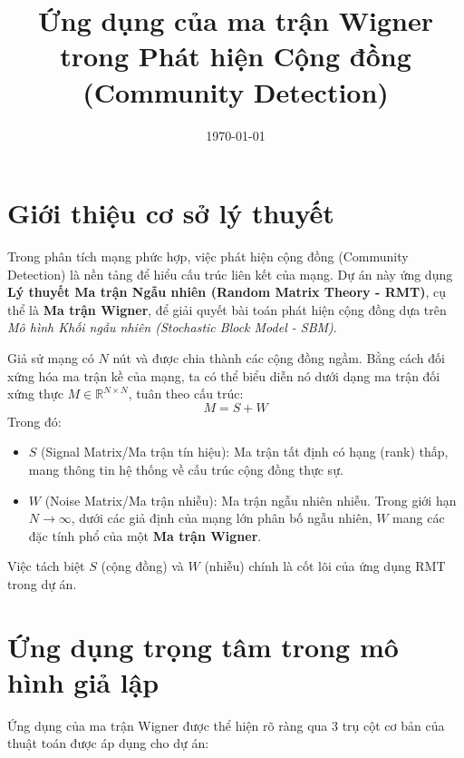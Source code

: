 \documentclass[12pt,a4paper]{article}
\title{\textbf{Ứng dụng của ma trận Wigner trong Phát hiện Cộng đồng (Community Detection)}}
\author{}
\date{\today}
\begin{document}
\maketitle

\section{Giới thiệu cơ sở lý thuyết}
Trong phân tích mạng phức hợp, việc phát hiện cộng đồng (Community Detection) là nền tảng để hiểu cấu trúc liên kết của mạng. Dự án này ứng dụng \textbf{Lý thuyết Ma trận Ngẫu nhiên (Random Matrix Theory - RMT)}, cụ thể là \textbf{Ma trận Wigner}, để giải quyết bài toán phát hiện cộng đồng dựa trên \textit{Mô hình Khối ngẫu nhiên (Stochastic Block Model - SBM)}.

Giả sử mạng có $N$ nút và được chia thành các cộng đồng ngầm. Bằng cách đối xứng hóa ma trận kề của mạng, ta có thể biểu diễn nó dưới dạng ma trận đối xứng thực $M \in \mathbb{R}^{N \times N}$, tuân theo cấu trúc:
\begin{equation}
    M = S + W
\end{equation}
Trong đó:
\begin{itemize}
    \item $S$ (Signal Matrix/Ma trận tín hiệu): Ma trận tất định có hạng (rank) thấp, mang thông tin hệ thống về cấu trúc cộng đồng thực sự.
    \item $W$ (Noise Matrix/Ma trận nhiễu): Ma trận ngẫu nhiên nhiễu. Trong giới hạn $N \to \infty$, dưới các giả định của mạng lớn phân bố ngẫu nhiên, $W$ mang các đặc tính phổ của một \textbf{Ma trận Wigner}.
\end{itemize}

Việc tách biệt $S$ (cộng đồng) và $W$ (nhiễu) chính là cốt lõi của ứng dụng RMT trong dự án.

\section{Ứng dụng trọng tâm trong mô hình giả lập}

Ứng dụng của ma trận Wigner được thể hiện rõ ràng qua 3 trụ cột cơ bản của thuật toán được áp dụng cho dự án:
\end{document}
